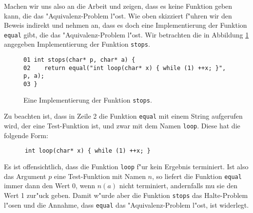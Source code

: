 Machen wir uns also an die Arbeit und zeigen, dass es keine Funktion geben kann, die das
"Aquivalenz-Problem l"ost.  Wie oben skizziert f"uhren wir den Beweis indirekt und nehmen
an, dass es doch eine Implementierung der Funktion \texttt{equal} gibt, die das
"Aquivalenz-Problem l"ost.  Wir betrachten die in Abbildung 
\ref{fig:stops} angegeben Implementierung der Funktion \texttt{stops}.
\begin{figure}[!h]
\begin{verbatim}
01 int stops(char* p, char* a) {
02    return equal("int loop(char* x) { while (1) ++x; }", p, a);
03 }
\end{verbatim}
  \caption{Eine Implementierung der Funktion \texttt{stops}.}
  \label{fig:stops}
\end{figure}

Zu beachten ist, dass in Zeile 2 die Funktion \texttt{equal} mit einem String aufgerufen
wird, der eine Test-Funktion ist, und zwar mit dem Namen \texttt{loop}.  Diese hat die
folgende Form:
\begin{verbatim}
      int loop(char* x) { while (1) ++x; }
\end{verbatim}
Es ist offensichtlich, dass die Funktion \texttt{loop} f"ur kein Ergebnis terminiert.
Ist also das Argument $p$ eine Test-Funktion mit Namen $n$, so liefert die Funktion \texttt{equal} immer dann den Wert 0,
wenn $n(a)$ nicht terminiert, andernfalls mu\3 sie den Wert 1 zur"uck geben.
Damit w"urde aber die Funktion \texttt{stops} das Halte-Problem l"osen und die Annahme,
dass \texttt{equal} das "Aquivalenz-Problem l"ost, ist widerlegt.
\pagebreak

